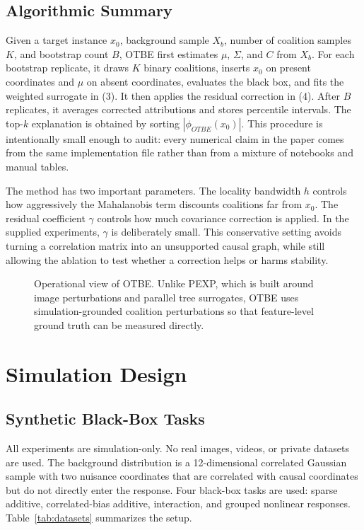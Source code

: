 \documentclass[10pt,conference,letterpaper]{IEEEtran}
\newcommand{\method}{OTBE}
\begin{document}
\subsection{Algorithmic Summary}
Given a target instance $x_0$, background sample $X_b$, number of coalition samples $K$, and bootstrap count $B$, \method{} first estimates $\mu$, $\Sigma$, and $C$ from $X_b$.  For each bootstrap replicate, it draws $K$ binary coalitions, inserts $x_0$ on present coordinates and $\mu$ on absent coordinates, evaluates the black box, and fits the weighted surrogate in (3).  It then applies the residual correction in (4).  After $B$ replicates, it averages corrected attributions and stores percentile intervals.  The top-$k$ explanation is obtained by sorting $|\phi_{\method}(x_0)|$.  This procedure is intentionally small enough to audit: every numerical claim in the paper comes from the same implementation file rather than from a mixture of notebooks and manual tables.

The method has two important parameters.  The locality bandwidth $h$ controls how aggressively the Mahalanobis term discounts coalitions far from $x_0$.  The residual coefficient $\gamma$ controls how much covariance correction is applied.  In the supplied experiments, $\gamma$ is deliberately small.  This conservative setting avoids turning a correlation matrix into an unsupported causal graph, while still allowing the ablation to test whether a correction helps or harms stability.

\begin{figure}[t]
\centering
{}
\caption{Operational view of \method{}.  Unlike PEXP, which is built around image perturbations and parallel tree surrogates, \method{} uses simulation-grounded coalition perturbations so that feature-level ground truth can be measured directly.}
\label{fig:pipeline}
\end{figure}

\section{Simulation Design}

\subsection{Synthetic Black-Box Tasks}
All experiments are simulation-only.  No real images, videos, or private datasets are used.  The background distribution is a 12-dimensional correlated Gaussian sample with two nuisance coordinates that are correlated with causal coordinates but do not directly enter the response.  Four black-box tasks are used: sparse additive, correlated-bias additive, interaction, and grouped nonlinear responses.  Table~\ref{tab:datasets} summarizes the setup.
\end{document}
